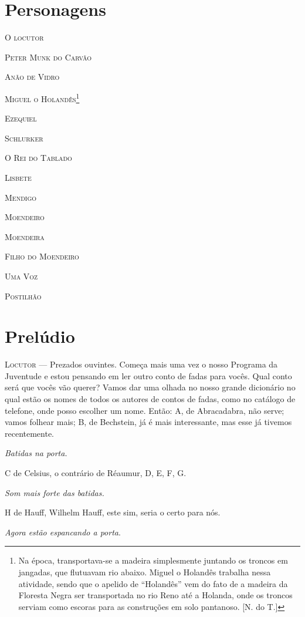 \section{Personagens}

\textsc{O locutor}

\textsc{Peter Munk do Carvão}

\textsc{Anão de Vidro}

\textsc{Miguel o Holandês}\footnote{Na época, transportava-se a madeira
  simplesmente juntando os troncos em jangadas, que flutuavam rio
  abaixo. Miguel o Holandês trabalha nessa atividade, sendo que o
  apelido de ``Holandês'' vem do fato de a madeira da Floresta Negra ser
  transportada no rio Reno até a Holanda, onde os troncos serviam como
  escoras para as construções em solo pantanoso. [N. do T.]}

\textsc{Ezequiel}

\textsc{Schlurker}

\textsc{O Rei do Tablado}

\textsc{Lisbete}

\textsc{Mendigo}

\textsc{Moendeiro}

\textsc{Moendeira}

\textsc{Filho do Moendeiro}

\textsc{Uma Voz}

\textsc{Postilhão}

\section{Prelúdio}

\textsc{Locutor} --- Prezados ouvintes. Começa mais uma vez o nosso Programa da
Juventude e estou pensando em ler outro conto de fadas para vocês. Qual
conto será que vocês vão querer? Vamos dar uma olhada no nosso grande
dicionário no qual estão os nomes de todos os autores de contos de
fadas, como no catálogo de telefone, onde posso escolher um nome. Então:
A, de Abracadabra, não serve; vamos folhear mais; B, de Bechstein, já é
mais interessante, mas esse já tivemos recentemente.

\emph{Batidas na porta.}

C de Celsius, o contrário de Réaumur, D, E, F, G.

\emph{Som mais forte das batidas.}

H de Hauff, Wilhelm Hauff, este sim, seria o certo para nós.

\emph{Agora estão espancando a porta}.

